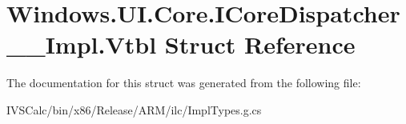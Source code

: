 \hypertarget{struct_windows_1_1_u_i_1_1_core_1_1_i_core_dispatcher_____impl_1_1_vtbl}{}\section{Windows.\+U\+I.\+Core.\+I\+Core\+Dispatcher\+\_\+\+\_\+\+Impl.\+Vtbl Struct Reference}
\label{struct_windows_1_1_u_i_1_1_core_1_1_i_core_dispatcher_____impl_1_1_vtbl}


The documentation for this struct was generated from the following file\+:\begin{DoxyCompactItemize}
\item 
I\+V\+S\+Calc/bin/x86/\+Release/\+A\+R\+M/ilc/Impl\+Types.\+g.\+cs\end{DoxyCompactItemize}
